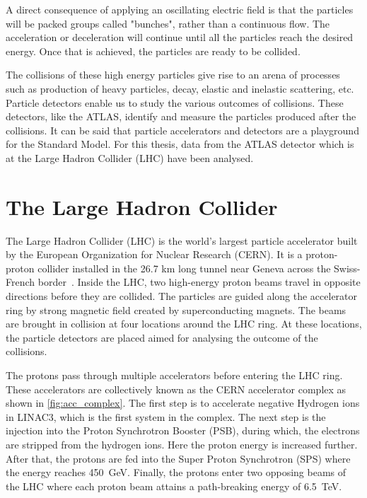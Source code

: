 A direct consequence of applying an oscillating electric field is that the particles will be packed 
groups called "bunches", rather than a continuous flow. The acceleration or deceleration
will continue until all the particles reach the desired energy. Once that is achieved, the particles
are ready to be collided.

The collisions of these high energy particles give rise to an arena of processes such as production 
of heavy particles, decay, elastic and inelastic scattering, etc. Particle detectors enable us to study
the various outcomes of collisions. These detectors, like the ATLAS, identify and measure the 
particles produced after the collisions. It can be said that particle accelerators and detectors are a 
playground for the Standard Model. For this thesis, data from the ATLAS detector which is at the 
Large Hadron Collider (LHC) have been analysed. 



\section{The Large Hadron Collider}
\label{sec:LHC}
The Large Hadron Collider (LHC) is the world's largest particle accelerator built by the 
European Organization for Nuclear Research (CERN). It is a proton-proton collider 
installed in the 26.7 km long tunnel near Geneva across the Swiss-French border~\cite{LyndonEvans_2008}. 
Inside the LHC, two high-energy proton beams travel in opposite directions before they are collided.
The particles are guided along the accelerator ring by strong magnetic field created by superconducting
magnets. The beams are brought in collision at four locations around the LHC ring. At these locations, 
the particle detectors are placed aimed for analysing the outcome of the collisions.

The protons pass through multiple accelerators before entering the LHC ring. These accelerators are
collectively known as the CERN accelerator complex as shown in \cref{fig:acc_complex}. The first step 
is to accelerate negative Hydrogen ions in LINAC3, which is the first system in the
complex. The next step is the injection into the Proton Synchrotron Booster (PSB), during which, 
the electrons are stripped from the hydrogen ions. Here the proton energy is increased further. After 
that, the protons are fed into the Super Proton Synchrotron (SPS) where the energy reaches \qty{450}{\GeV}. 
Finally, the protons enter two opposing beams of the LHC where each proton beam attains a 
path-breaking energy of \qty{6.5}{\TeV}. 

